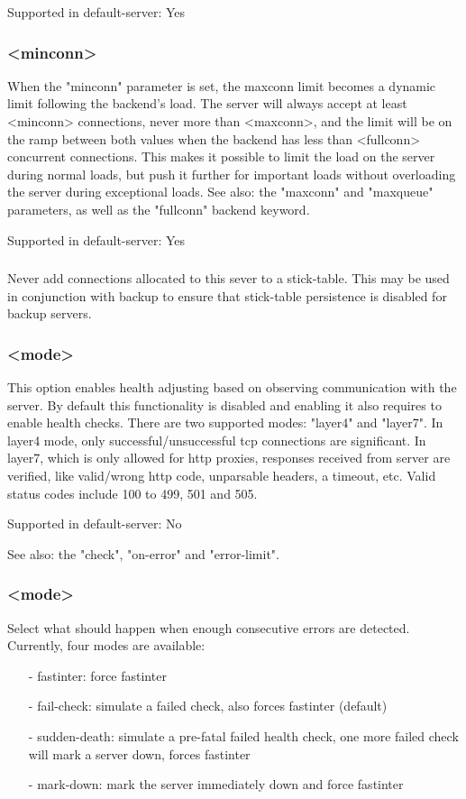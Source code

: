   Supported in default-server: Yes

\subsubsection[minconn]{ <minconn>}
  When the "minconn" parameter is set, the maxconn limit becomes a dynamic
  limit following the backend's load. The server will always accept at least
  <minconn> connections, never more than <maxconn>, and the limit will be on
  the ramp between both values when the backend has less than <fullconn>
  concurrent connections. This makes it possible to limit the load on the
  server during normal loads, but push it further for important loads without
  overloading the server during exceptional loads. See also: the "maxconn"
  and "maxqueue" parameters, as well as the "fullconn" backend keyword.

  Supported in default-server: Yes

\subsubsection[non-stick]{}
  Never add connections allocated to this sever to a stick-table.
  This may be used in conjunction with backup to ensure that
  stick-table persistence is disabled for backup servers.

\subsubsection[observe]{ <mode>}
  This option enables health adjusting based on observing communication with
  the server. By default this functionality is disabled and enabling it also
  requires to enable health checks. There are two supported modes: "layer4" and
  "layer7". In layer4 mode, only successful/unsuccessful tcp connections are
  significant. In layer7, which is only allowed for http proxies, responses
  received from server are verified, like valid/wrong http code, unparsable
  headers, a timeout, etc. Valid status codes include 100 to 499, 501 and 505.

  Supported in default-server: No

  See also: the "check", "on-error" and "error-limit".

\subsubsection[on-error]{ <mode>}
  Select what should happen when enough consecutive errors are detected.
  Currently, four modes are available:
  \begin{itemize}
  \item[-] fastinter: force fastinter
  \item[-] fail-check: simulate a failed check, also forces fastinter (default)
  \item[-] sudden-death: simulate a pre-fatal failed health check, one more failed
    check will mark a server down, forces fastinter
  \item[-] mark-down: mark the server immediately down and force fastinter
  \end{itemize}

